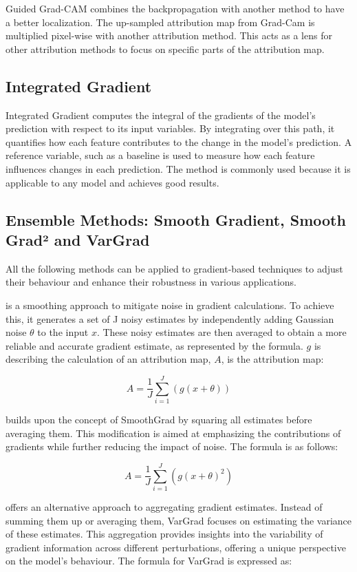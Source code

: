 Guided Grad-CAM combines the backpropagation \cite{springenberg2015striving} with another method to have a better localization. The up-sampled attribution map from Grad-Cam is multiplied pixel-wise with another attribution method. This acts as a lens for other attribution methods to focus on specific parts of the attribution map.

\subsection{Integrated Gradient}
\label{IG}
Integrated Gradient \cite{sundararajan2017axiomatic} computes the integral of the gradients of the model's prediction with respect to its input variables. By integrating over this path, it quantifies how each feature contributes to the change in the model's prediction. A reference variable, such as a baseline is used to measure how each feature influences changes in each prediction. The method is commonly used because it is applicable to any model and achieves good results.

\subsection{Ensemble Methods: Smooth Gradient, Smooth Grad² and VarGrad}

All the following methods can be applied to gradient-based techniques to adjust their behaviour and enhance their robustness in various applications.

 \cite{smilkov2017smoothgrad} is a smoothing approach to mitigate noise in gradient calculations. To achieve this, it generates a set of J noisy estimates by independently adding Gaussian noise $\theta$ to the input $x$. These noisy estimates are then averaged to obtain a more reliable and accurate gradient estimate, as represented by the formula. $g$ is describing the calculation of an attribution map, $A$, is the attribution map:

$$ A = \frac{1}{J}\sum_{i=1}^{J} (g(x+\theta))$$

 \cite{hooker2019benchmark} builds upon the concept of SmoothGrad by squaring all estimates before averaging them. This modification is aimed at emphasizing the contributions of gradients while further reducing the impact of noise. The formula is as follows:

$$ A = \frac{1}{J}\sum_{i=1}^{J} (g(x+\theta)^2)$$

 \cite{adebayo2020sanity} offers an alternative approach to aggregating gradient estimates. Instead of summing them up or averaging them, VarGrad focuses on estimating the variance of these estimates. This aggregation provides insights into the variability of gradient information across different perturbations, offering a unique perspective on the model's behaviour. The formula for VarGrad is expressed as:

